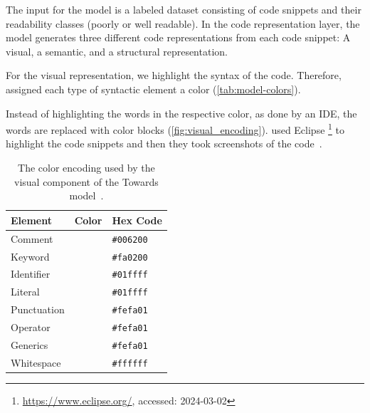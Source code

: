 \documentclass[%
class=scrreprt,
chapterprefix=false,%
open=right,%
twoside=true,%
paper=a4,%
logofile={Logo\_zentral\_farbig\_EN.png},%
thesistype=master,%
UKenglish,%
]{se2thesis}
\newcounter{urlfootnote}
\newcommand{\onecurl}[2]{%
	\stepcounter{urlfootnote}%
	\expandafter\def\csname urlfootnote:#1\endcsname{\theurlfootnote}%
	\footnote{\label{url:#1}\url{#1}, accessed: #2}%
}
\newcommand{\curl}[2]{%
		\onecurl{#1}{#2}%
}
\theoremstyle{definition}
\begin{document}
	The input for the model is a labeled dataset consisting of code snippets and their readability classes (poorly or well readable). In the code representation layer, the model generates three different code representations from each code snippet: A visual, a semantic, and a structural representation. 
	
	For the visual representation, we highlight the syntax of the code. Therefore, \citeauthor{mi2022towards} assigned each type of syntactic element a color (\autoref{tab:model-colors}). 
	
	Instead of highlighting the words in the respective color, as done by an IDE, the words are replaced with color blocks (\autoref{fig:visual_encoding}). \citeauthor{mi2022towards} used Eclipse\curl{https://www.eclipse.org/}{2024-03-02} to highlight the code snippets and then they took screenshots of the code~\cite{mi2022towards}.
		
	\begin{table}[tb]
		\centering
		\caption{The color encoding used by the visual component of the Towards model~\cite{mi2022towards}.}
		\label{tab:model-colors}
		\begin{tabular}{lll}
			\toprule
			Element & Color & Hex Code \\
			\midrule
			Comment & \cellcolor{CommentColor} & \texttt{\#006200} \\
			Keyword & \cellcolor{KeywordColor} & \texttt{\#fa0200} \\
			Identifier & \cellcolor{IdentifierColor} & \texttt{\#01ffff} \\
			Literal & \cellcolor{LiteralColor} & \texttt{\#01ffff} \\
			Punctuation & \cellcolor{PunctuationColor} & \texttt{\#fefa01} \\
			Operator & \cellcolor{OperatorColor} & \texttt{\#fefa01} \\
			Generics & \cellcolor{GenericsColor} & \texttt{\#fefa01} \\
			Whitespace & \cellcolor{WhitespaceColor} & \texttt{\#ffffff} \\
			\bottomrule
		\end{tabular}
	\end{table}
		
\end{document}
